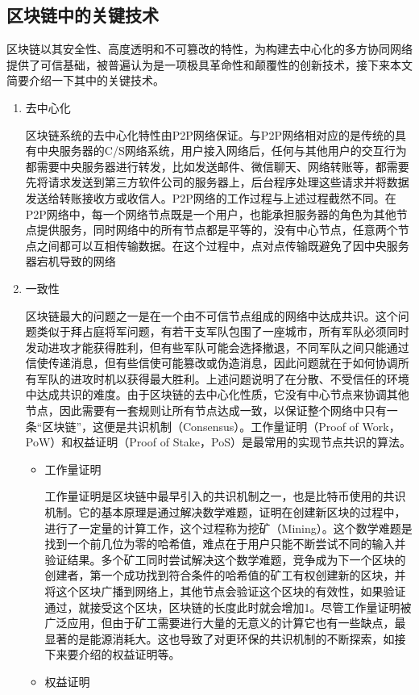 \subsection{区块链中的关键技术}
区块链以其安全性、高度透明和不可篡改的特性，为构建去中心化的多方协同网络提供了可信基础，被普遍认为是一项极具革命性和颠覆性的创新技术，接下来本文简要介绍一下其中的关键技术。
\begin{enumerate}[label=\Alph*., align=left, leftmargin=*]
    \item 去中心化
    
    区块链系统的去中心化特性由P2P网络保证。与P2P网络相对应的是传统的具有中央服务器的C/S网络系统，用户接入网络后，任何与其他用户的交互行为都需要中央服务器进行转发，比如发送邮件、微信聊天、网络转账等，都需要先将请求发送到第三方软件公司的服务器上，后台程序处理这些请求并将数据发送给转账接收方或收信人。P2P网络的工作过程与上述过程截然不同。在P2P网络中，每一个网络节点既是一个用户，也能承担服务器的角色为其他节点提供服务，同时网络中的所有节点都是平等的，没有中心节点，任意两个节点之间都可以互相传输数据。在这个过程中，点对点传输既避免了因中央服务器宕机导致的网络
    \item 一致性
    
    区块链最大的问题之一是在一个由不可信节点组成的网络中达成共识。这个问题类似于拜占庭将军问题\cite{Lamport1982TheBG}，有若干支军队包围了一座城市，所有军队必须同时发动进攻才能获得胜利，但有些军队可能会选择撤退，不同军队之间只能通过信使传递消息，但有些信使可能篡改或伪造消息，因此问题就在于如何协调所有军队的进攻时机以获得最大胜利。上述问题说明了在分散、不受信任的环境中达成共识的难度。由于区块链的去中心化性质，它没有中心节点来协调其他节点，因此需要有一套规则让所有节点达成一致，以保证整个网络中只有一条“区块链”，这便是共识机制（Consensus）。工作量证明（Proof of Work，PoW）和权益证明（Proof of Stake，PoS）是最常用的实现节点共识的算法。
    \begin{itemize}
        \item 工作量证明
        
        工作量证明是区块链中最早引入的共识机制之一，也是比特币使用的共识机制。它的基本原理是通过解决数学难题，证明在创建新区块的过程中，进行了一定量的计算工作，这个过程称为挖矿（Mining）。这个数学难题是找到一个前几位为零的哈希值，难点在于用户只能不断尝试不同的输入并验证结果。多个矿工同时尝试解决这个数学难题，竞争成为下一个区块的创建者，第一个成功找到符合条件的哈希值的矿工有权创建新的区块，并将这个区块广播到网络上，其他节点会验证这个区块的有效性，如果验证通过，就接受这个区块，区块链的长度此时就会增加1。尽管工作量证明被广泛应用，但由于矿工需要进行大量的无意义的计算它也有一些缺点，最显著的是能源消耗大。这也导致了对更环保的共识机制的不断探索，如接下来要介绍的权益证明等。
        \item 权益证明
        

\end{itemize}
\end{enumerate}
